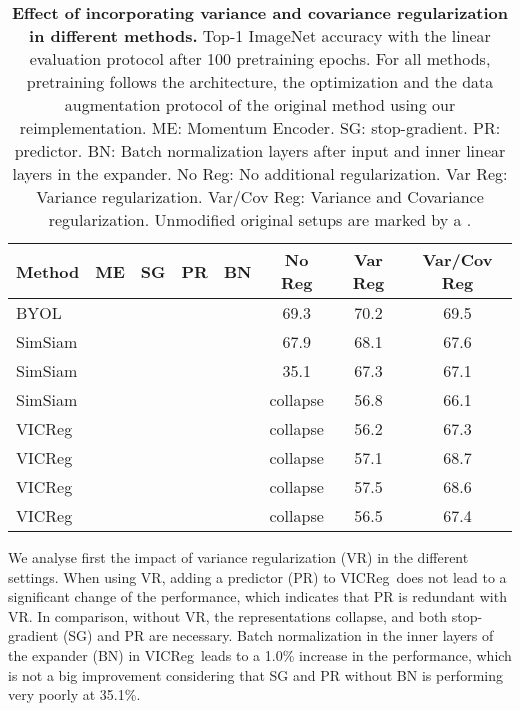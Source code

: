 \documentclass{article}
\makeatletter
\newcommand{\algo}{VICReg}
\newcommand{\expander}{expander }
\newcommand{\expandernospace}{expander}
\newcommand{\cmark}{\ding{51}}\newcommand{\bigcell}[2]{\begin{tabular}{@{}#1@{}}#2\end{tabular}}
\makeatother
\begin{document}
\begin{table}[t]
\caption{\textbf{Effect of incorporating variance and covariance regularization in different methods.} Top-1 ImageNet accuracy with the linear evaluation protocol after 100 pretraining epochs. For all methods, pretraining follows the architecture, the optimization and the data augmentation protocol of the original method using our reimplementation. ME: Momentum Encoder. SG: stop-gradient. PR: predictor. BN: Batch normalization layers after input and inner linear layers in the \expandernospace. No Reg: No additional regularization. Var Reg: Variance regularization. Var/Cov Reg: Variance and Covariance regularization. Unmodified original setups are marked by a .}
\label{tab:ablation}
\vspace{-1.5em}
\setlength{\tabcolsep}{10.5pt}
\vskip 0.15in
\begin{center}
\begin{tabular}{lcccc|ccc}
\toprule
Method & ME & SG & PR & BN & No Reg & Var Reg & Var/Cov Reg \\
\midrule
BYOL            & \cmark & \cmark & \cmark & \cmark & \hspace{0.14em} 69.3 & 70.2 & 69.5 \\
SimSiam         &        & \cmark & \cmark & \cmark & \hspace{0.14em} 67.9 & 68.1 & 67.6 \\
SimSiam         &        & \cmark & \cmark &        & 35.1      & 67.3 & 67.1 \\
SimSiam         &        & \cmark &        &        & collapse  & 56.8 & 66.1 \\
\algo           &        &        & \cmark &        & collapse  & 56.2 & 67.3 \\
\algo           &        &        & \cmark & \cmark & collapse  & 57.1 & 68.7 \\
\algo           &        &        &        & \cmark & collapse  & 57.5 & \hspace{0.14em} 68.6 \\
\algo           &        &        &        &        & collapse  & 56.5 & 67.4 \\
\bottomrule
\end{tabular}
\end{center}
\vspace{-2mm}
\end{table}


We analyse first the impact of variance regularization (VR) in the different settings. When using VR, adding a predictor (PR) to \algo \ does not lead to a significant change of the performance, which indicates that PR is redundant with VR. In comparison, without VR, the representations collapse, and both stop-gradient (SG) and PR are necessary. Batch normalization in the inner layers of the \expander (BN) in \algo \ leads to a 1.0\% increase in the performance, which is not a big improvement considering that SG and PR without BN is performing very poorly at 35.1\%. 
\end{document}
